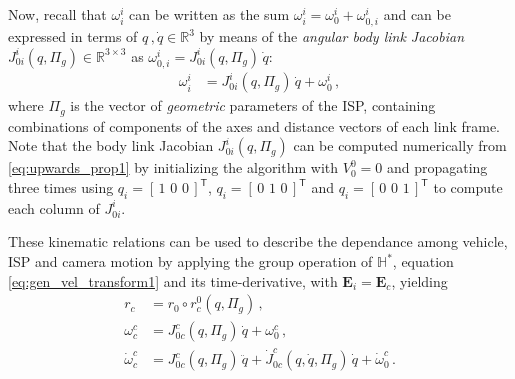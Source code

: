 Now, recall that $\omega^{i}_{i}$ can be written as the sum $\omega^{i}_{i} = \omega^{i}_{0} + \omega^{i}_{0,i}$
%
and can be expressed in terms of $q\,,\dot{q}\in\mathbb{R}^{3}$ by means of the \textit{angular body link Jacobian} $J^i_{0i}(q,\Pi_g) \in \mathbb{R}^{3 \times 3}$ as $\omega^{i}_{0,i} = J^{i}_{0i}(q,\Pi_g) \, \dot{q}$:
%
%
\begin{align}
\omega^{i}_{i} &= J^{i}_{0i}(q,\Pi_g) \, \dot{q} + \omega^{i}_{0} \,,
\label{eq:gen_vel_transform1}
\end{align}
%
where $\Pi_g$ is the vector of {\it geometric} parameters of the ISP, containing combinations of components of the axes and distance vectors of each link frame.
%
Note that the body link Jacobian $J^i_{0i}(q,\Pi_g)$ can be computed numerically from \eqref{eq:upwards_prop1} by initializing the algorithm with $V^0_0 = 0$ and propagating three times using $q_i = [\,1 \,\, 0 \,\, 0\,]^\mathsf{T}$, $q_i = [\,0 \,\, 1 \,\, 0\,]^\mathsf{T}$ and $q_i = [\, 0 \,\, 0 \,\, 1 \,]^\mathsf{T}$ to compute each column of $J^i_{0i}$.
%
%
%
%

These kinematic relations can be used to describe the dependance among vehicle, ISP and camera motion by applying the group operation of $\mathbb{H}^*$, equation \eqref{eq:gen_vel_transform1} and its time-derivative, with $\mathbf{E}_i = \mathbf{E}_c$, yielding
%
\begin{align}
r_{c} &= r_{0} \circ r^0_{c}(q,\Pi_g) \,, \label{eq:camera_orientation1} \\
\omega^{c}_{c} &= J^{c}_{0c}(q,\Pi_g) \, \dot{q} + \omega^{c}_{0} \,, \label{eq:camera_orientation2} \\
\dot{\omega}^{c}_{c} &= J^{c}_{0c}(q,\Pi_g) \, \ddot{q} + \dot{J}^{c}_{0c}(q,\dot{q},\Pi_g) \, \dot{q} + \dot{\omega}^{c}_{0} \,. \label{eq:camera_orientation3}
\end{align}

